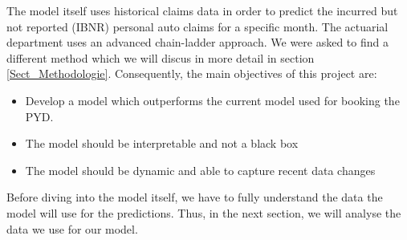 The model itself uses historical claims data in order to predict the incurred but not reported (IBNR) personal auto claims for a specific month. The actuarial department uses an advanced chain-ladder approach. We were asked to find a different method which we will discus in more detail in section \ref{Sect_Methodologie}. Consequently, the main objectives of this project are:
\begin{itemize}
	\item Develop a model which outperforms the current model used for booking the PYD.
	\item The model should be interpretable and not a black box
	\item The model should be dynamic and able to capture recent data changes
\end{itemize}
Before diving into the model itself, we have to fully understand the data the model will use for the predictions. Thus, in the next section, we will analyse the data we use for our model.

 

	
	